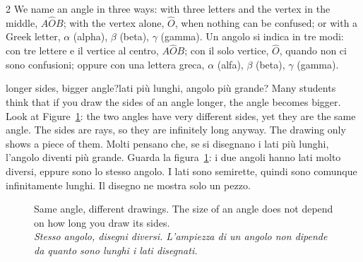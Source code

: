 \documentclass[10pt,a4paper,oneside]{book}
\newif\ifIT
\newenvironment{bi}%
  {\begin{paracol}{2}\global\ITfalse\selectlanguage{english}}%
  {\end{paracol}}
\newcommand{\IT}{\switchcolumn\global\ITtrue\selectlanguage{italian}}
\newcommand{\bicap}[2]{\caption{#1\\{\color{itgreen}\itshape #2}}}
\newcommand{\ang}[3]{#1\widehat{#2}#3}      %
\newcommand{\av}[1]{\widehat{#1}}           %
\begin{document}
\begin{bi}
We name an angle in three ways: with three letters and the vertex in the middle, $\ang{A}{O}{B}$; with the vertex alone, $\av{O}$, when nothing can be confused; or with a Greek letter, $\alpha$ (alpha), $\beta$ (beta), $\gamma$ (gamma).
\IT
Un angolo si indica in tre modi: con tre lettere e il vertice al centro, $\ang{A}{O}{B}$; con il solo vertice, $\av{O}$, quando non ci sono confusioni; oppure con una lettera greca, $\alpha$ (alfa), $\beta$ (beta), $\gamma$ (gamma).
\end{bi}

\begin{trap}{longer sides, bigger angle?}{lati più lunghi, angolo più grande?}
Many students think that if you draw the sides of an angle longer, the angle becomes bigger. Look at Figure~\ref{fig:sides}: the two angles have very different sides, yet they are the same angle. The sides are rays, so they are infinitely long anyway. The drawing only shows a piece of them.
\tcblower
Molti pensano che, se si disegnano i lati più lunghi, l'angolo diventi più grande. Guarda la figura~\ref{fig:sides}: i due angoli hanno lati molto diversi, eppure sono lo stesso angolo. I lati sono semirette, quindi sono comunque infinitamente lunghi. Il disegno ne mostra solo un pezzo.
\end{trap}

\begin{figure}[htbp]
\centering
\bicap{Same angle, different drawings. The size of an angle does not depend on how long you draw its sides.}%
      {Stesso angolo, disegni diversi. L'ampiezza di un angolo non dipende da quanto sono lunghi i lati disegnati.}
\label{fig:sides}
\end{figure}
\end{document}
